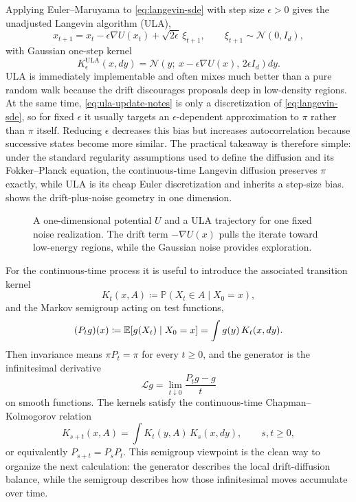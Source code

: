 Applying Euler--Maruyama to \eqref{eq:langevin-sde} with step size $\epsilon>0$ gives the unadjusted Langevin algorithm (ULA),
\begin{equation}
  x_{t+1}
  =
  x_t - \epsilon \nabla U(x_t) + \sqrt{2\epsilon}\,\xi_{t+1},
  \qquad
  \xi_{t+1}\sim\mathcal{N}(0,I_d),
  \label{eq:ula-update-notes}
\end{equation}
with Gaussian one-step kernel
\[
  K^{\mathrm{ULA}}_\epsilon(x,dy)
  =
  \mathcal{N}\!\left(y;\ x-\epsilon\nabla U(x),\,2\epsilon I_d\right)dy.
\]
ULA is immediately implementable and often mixes much better than a pure random walk because the drift discourages proposals deep in low-density regions.
At the same time, \eqref{eq:ula-update-notes} is only a discretization of \eqref{eq:langevin-sde}, so for fixed $\epsilon$ it usually targets an $\epsilon$-dependent approximation to $\pi$ rather than $\pi$ itself.
Reducing $\epsilon$ decreases this bias but increases autocorrelation because successive states become more similar.
The practical takeaway is therefore simple: under the standard regularity assumptions used to define the diffusion and its Fokker--Planck equation, the continuous-time Langevin diffusion preserves \(\pi\) exactly, while ULA is its cheap Euler discretization and inherits a step-size bias.
 shows the drift-plus-noise geometry in one dimension.

\begin{figure}[t]
  \centering
  
  \caption{A one-dimensional potential $U$ and a ULA trajectory for one fixed noise realization.
  The drift term $-\nabla U(x)$ pulls the iterate toward low-energy regions, while the Gaussian noise provides exploration.}
  \label{fig:ula-energy-path}
\end{figure}

For the continuous-time process it is useful to introduce the associated transition kernel
\[
  K_t(x,A)\coloneqq \mathbb{P}(X_t\in A\mid X_0=x),
\]
and the Markov semigroup acting on test functions,
\[
  (P_t g)(x)\coloneqq \mathbb{E}[g(X_t)\mid X_0=x]=\int g(y)\,K_t(x,dy).
\]
Then invariance means \(\pi P_t=\pi\) for every \(t\ge 0\), and the generator is the infinitesimal derivative
\[
  \mathcal{L}g=\lim_{t\downarrow 0}\frac{P_t g-g}{t}
\]
on smooth functions.
The kernels satisfy the continuous-time Chapman--Kolmogorov relation
\[
  K_{s+t}(x,A)=\int K_t(y,A)\,K_s(x,dy),
  \qquad
  s,t\ge 0,
\]
or equivalently \(P_{s+t}=P_sP_t\).
This semigroup viewpoint is the clean way to organize the next calculation: the generator describes the local drift-diffusion balance, while the semigroup describes how those infinitesimal moves accumulate over time.

